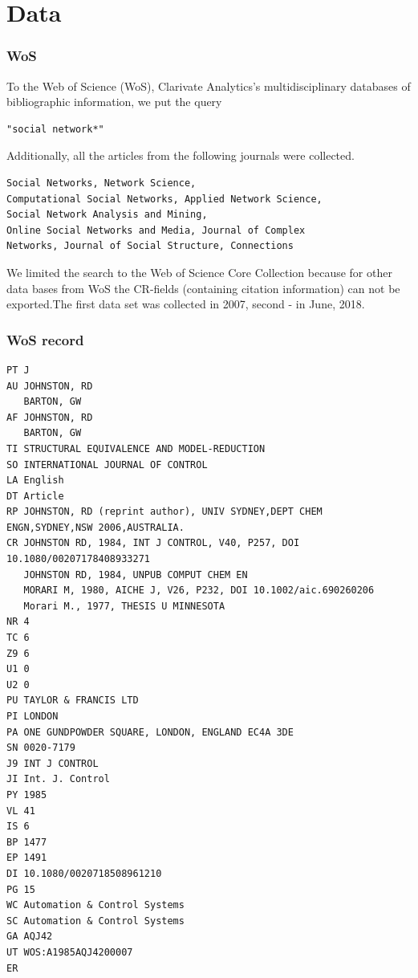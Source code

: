 \documentclass[hyperref={pdfstartview={FitBH -32768},
                         pdfpagemode=FullScreen,
                         plainpages=false,
                         colorlinks=true}
              ]{beamer}
\begin{document}
\section{Data}

\begin{frame}[fragile]
\frametitle{WoS}
\small

To the Web of Science (WoS), Clarivate Analytics’s multidisciplinary databases of bibliographic
information, we put the query
\begin{verbatim} 
"social network*"
\end{verbatim}
Additionally, all the articles from the following journals were collected.
\begin{verbatim}
Social Networks, Network Science, 
Computational Social Networks, Applied Network Science, 
Social Network Analysis and Mining,
Online Social Networks and Media, Journal of Complex 
Networks, Journal of Social Structure, Connections 
\end{verbatim}
We limited the search to the Web of Science Core Collection because for other data bases from WoS the CR-fields (containing citation information) can not
be exported.The first data set was collected in 2007, second - in June, 2018. 
\end{frame}

\begin{frame}[fragile]
\frametitle{WoS record}
\renewcommand{\baselinestretch}{0.8}
\tiny
\begin{verbatim}
PT J
AU JOHNSTON, RD
   BARTON, GW
AF JOHNSTON, RD
   BARTON, GW
TI STRUCTURAL EQUIVALENCE AND MODEL-REDUCTION
SO INTERNATIONAL JOURNAL OF CONTROL
LA English
DT Article
RP JOHNSTON, RD (reprint author), UNIV SYDNEY,DEPT CHEM ENGN,SYDNEY,NSW 2006,AUSTRALIA.
CR JOHNSTON RD, 1984, INT J CONTROL, V40, P257, DOI 10.1080/00207178408933271
   JOHNSTON RD, 1984, UNPUB COMPUT CHEM EN
   MORARI M, 1980, AICHE J, V26, P232, DOI 10.1002/aic.690260206
   Morari M., 1977, THESIS U MINNESOTA
NR 4
TC 6
Z9 6
U1 0
U2 0
PU TAYLOR & FRANCIS LTD
PI LONDON
PA ONE GUNDPOWDER SQUARE, LONDON, ENGLAND EC4A 3DE
SN 0020-7179
J9 INT J CONTROL
JI Int. J. Control
PY 1985
VL 41
IS 6
BP 1477
EP 1491
DI 10.1080/0020718508961210
PG 15
WC Automation & Control Systems
SC Automation & Control Systems
GA AQJ42
UT WOS:A1985AQJ4200007
ER
\end{verbatim}

\end{frame}
\end{document}
